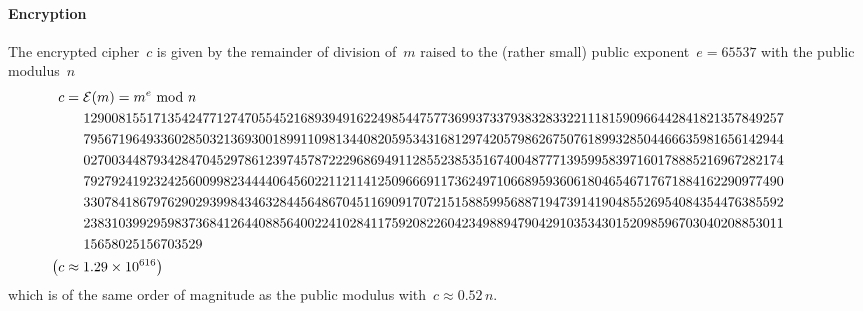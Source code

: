 \documentclass{article}
\begin{document}
\paragraph{Encryption}  The encrypted cipher~$c$ is given by the remainder of division of~$m$ raised to the (rather small) public exponent~$e = 65537$ with the public modulus~$n$
\begin{align*}
\hspace*{-1cm} c &= \mathcal{E}(m) = m^e \,\,\text{mod}\,\,n \\ 
\hspace*{-1cm} & \hspace{0.48cm} 1290081551713542477127470554521689394916224985447577369937337938328332211181590966442841821357849257 \\
\hspace*{-1cm} & \hspace{0.48cm} 7956719649336028503213693001899110981344082059534316812974205798626750761899328504466635981656142944 \\
\hspace*{-1cm} & \hspace{0.48cm} 0270034487934284704529786123974578722296869491128552385351674004877713959958397160178885216967282174  \\
\hspace*{-1cm} & \hspace{0.48cm} 7927924192324256009982344440645602211211412509666911736249710668959360618046546717671884162290977490  \\
\hspace*{-1cm} & \hspace{0.48cm} 3307841867976290293998434632844564867045116909170721515885995688719473914190485526954084354476385592  \\
\hspace*{-1cm} & \hspace{0.48cm} 2383103992959837368412644088564002241028411759208226042349889479042910353430152098596703040208853011  \\
\hspace*{-1cm} & \hspace{0.48cm} 15658025156703529  \\
\hspace*{-1cm} \big( c &\approx 1.29 \times 10^{616} \big)
\end{align*}
which is of the same order of magnitude as the public modulus with~$c \approx 0.52 \, n$.
\end{document}
